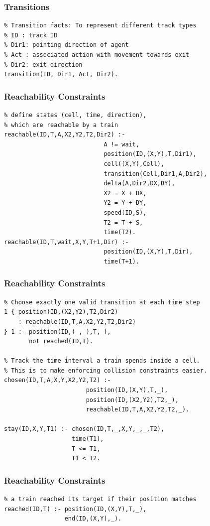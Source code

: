 \documentclass{beamer}
\begin{document}
\begin{frame}[fragile]
\frametitle{Transitions}
  \begin{verbatim}
% Transition facts: To represent different track types
% ID : track ID
% Dir1: pointing direction of agent
% Act : associated action with movement towards exit
% Dir2: exit direction
transition(ID, Dir1, Act, Dir2).
  \end{verbatim}
\end{frame}

\begin{frame}[fragile]
\frametitle{Reachability Constraints}
  \begin{verbatim}
% define states (cell, time, direction),
% which are reachable by a train 
reachable(ID,T,A,X2,Y2,T2,Dir2) :-
                            A != wait,
                            position(ID,(X,Y),T,Dir1),
                            cell((X,Y),Cell),
                            transition(Cell,Dir1,A,Dir2),
                            delta(A,Dir2,DX,DY),
                            X2 = X + DX,
                            Y2 = Y + DY,
                            speed(ID,S),
                            T2 = T + S,
                            time(T2).
reachable(ID,T,wait,X,Y,T+1,Dir) :-
                            position(ID,(X,Y),T,Dir),
                            time(T+1).
  \end{verbatim}
\end{frame}

\begin{frame}[fragile]
\frametitle{Reachability Constraints}
  \begin{verbatim}
% Choose exactly one valid transition at each time step
1 { position(ID,(X2,Y2),T2,Dir2)
    : reachable(ID,T,A,X2,Y2,T2,Dir2)
} 1 :- position(ID,(_,_),T,_),
       not reached(ID,T).
       
% Track the time interval a train spends inside a cell.
% This is to make enforcing collision constraints easier.
chosen(ID,T,A,X,Y,X2,Y2,T2) :-
                       position(ID,(X,Y),T,_),
                       position(ID,(X2,Y2),T2,_),
                       reachable(ID,T,A,X2,Y2,T2,_).
                       
stay(ID,X,Y,T1) :- chosen(ID,T,_,X,Y,_,_,T2),
                   time(T1),
                   T <= T1,
                   T1 < T2.

  \end{verbatim}
\end{frame}

\begin{frame}[fragile]
\frametitle{Reachability Constraints}
  \begin{verbatim}    
% a train reached its target if their position matches 
reached(ID,T) :- position(ID,(X,Y),T,_),
                 end(ID,(X,Y),_).
  \end{verbatim}
\end{frame}
\end{document}
